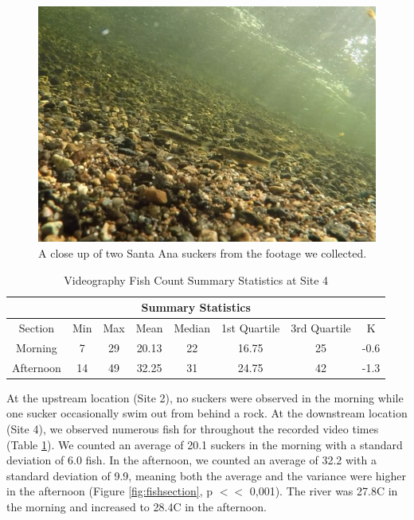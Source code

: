 \documentclass{article}\usepackage[]{graphicx}\usepackage[]{color}
\begin{document}
\begin{figure}
\includegraphics[scale=.4]{Videography_figures/reallygoodcrop}
\caption{A close up of two Santa Ana suckers from the footage we collected.}
\label{fig:reallygoodcrop}
\end{figure}



\begin{table}[!ht]
\caption{Videography Fish Count Summary Statistics at Site 4}
\begin{tabular}{cccccccc}
 \hline
 \multicolumn{8}{c}{Summary Statistics} \\
 \hline
 Section & Min & Max & Mean & Median & 1st Quartile & 3rd Quartile & K\\
 \hline
 Morning & 7 & 29 & 20.13 & 22  & 16.75 & 25 & -0.6\\
 Afternoon & 14 & 49 & 32.25 & 31 & 24.75 &  42 & -1.3\\
 \hline
\end{tabular}
\label{tab:fishcounts}
\end{table}

At the upstream location (Site 2), no suckers were observed in the morning while one sucker occasionally swim out from behind a rock. At the downstream location (Site 4), we observed numerous fish for throughout the recorded video times (Table \ref{tab:fishcounts}). We counted an average of 20.1 suckers in the morning with a standard deviation of 6.0 fish.  In the afternoon, we counted an average of 32.2 with a standard deviation of 9.9, meaning both the average and the variance were higher in the afternoon (Figure \ref{fig:fishsection}, p $<<$ 0,001).  The river was 27.8\textdegree C in the morning and increased to 28.4\textdegree C in the afternoon. 
\end{document}
